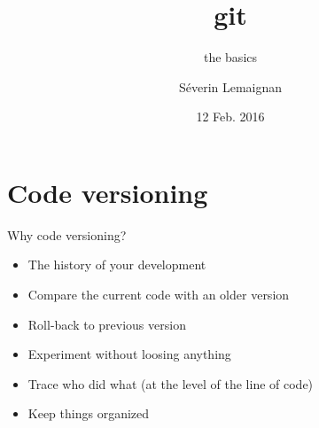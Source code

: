 \documentclass[compress]{beamer}
\title{\Medium git}
\subtitle{the basics}
\date{12 Feb. 2016}
\author{Séverin Lemaignan}
\institute{Centre for Robotics \& Neural
Systems\\{\Medium Plymouth University}}
\begin{document}
\maketitle



{
    \begin{frame}[plain]{}
    \end{frame}
}

\section{Code versioning}

\begin{frame}{Why code versioning?}

    \begin{itemize}
        \item The history of your development
        \item Compare the current code with an older version
        \item Roll-back to previous version
        \item Experiment without loosing anything
        \item Trace who did what (at the level of the line of code)
        \item Keep things organized
    \end{itemize}
\end{frame}
\end{document}
